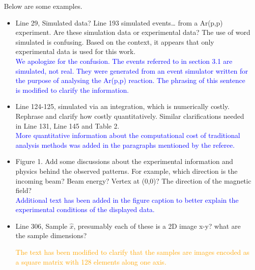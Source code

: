 \documentclass[12pt]{article}
\begin{document}
Below are some examples.
\begin{itemize}
\item Line 29, Simulated data? Line 193 simulated events… from a Ar(p,p) experiment. Are these
simulation data or experimental data? The use of word simulated is confusing. Based on the context,
it appears that only experimental data is used for this work.\\
\textcolor{blue}{We apologize for the confusion. The events referred to in section 3.1 are simulated, not real. They were generated from an event simulator written for the purpose of analysing the Ar(p,p) reaction. The phrasing of this sentence is modified to clarify the information.}
\item Line 124-125, simulated via an integration, which is numerically costly. Rephrase and clarify how
costly quantitatively. Similar clarifications needed in Line 131, Line 145 and Table 2.\\
\textcolor{blue}{More quantitative information about the computational cost of traditional analysis methods was added in the paragraphs mentioned by the referee.}
\item Figure 1. Add some discussions about the experimental information and physics behind the
observed patterns. For example, which direction is the incoming beam? Beam energy? Vertex at
(0,0)? The direction of the magnetic field?\\

\textcolor{blue}{Additional text has been added in the figure caption to better explain the experimental conditions of the displayed data.}
\item Line 306, Sample $\hat{x}$, presumably each of these is a 2D image x-y? what are the sample
dimensions?

\textcolor{orange}{The text has been modified to clarify that the samples are images encoded as a square matrix with 128 elements along one axis.}
    

\end{itemize}
\end{document}
